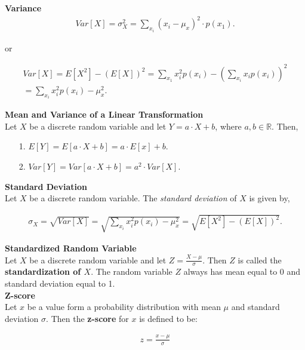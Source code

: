 \documentclass{article}
\numberwithin{theorem}{subsection}
\numberwithin{theorem}{subsubsection}
\theoremstyle{definition}
\numberwithin{definition}{subsection}
\numberwithin{definition}{subsubsection}
\begin{document}
\noindent \textbf{Variance} \\
\begin{gather*}
    Var[X] = \sigma_{X}^{2} = \sum_{x_{i}} (x_{i} - \mu_{x})^{2} \cdot p(x_{1}).    
\end{gather*}

or

\begin{gather*}
    Var[X] = E[X^2] - (E[X])^{2} = \sum_{x_{1}} x_{i}^{2} p(x_{i}) - \left ( \sum_{x_{i}} x_{i} p(x_{i})\right )^{2} \\
    = \sum_{x_{i}} x_{i}^{2} p(x_{i}) - \mu_{x}^{2}.
\end{gather*}

\noindent \textbf{Mean and Variance of a Linear Transformation} \\
\indent Let $X$ be a discrete random variable and let $Y = a\cdot X + b$, where $a,b \in \mathbb{R}$. Then,
\begin{itemize}
    \item[1.] \quad $E[Y] = E[a\cdot X + b] = a\cdot E[x] + b$.
    \item[2.] \quad $Var[Y] = Var[a\cdot X + b] = a^2 \cdot Var[X]$. 
\end{itemize}

\noindent \textbf{Standard Deviation} \\
Let $X$ be a discrete random variable. The \textit{standard deviation} of $X$ is given by,

\begin{gather*}
    \sigma_{X} = \sqrt{Var[X]} = \sqrt{\sum_{x_{i}} x_{i}^{2} p(x_{i}) - \mu_{x}^{2}} = \sqrt{E[X^2] - (E[X])^2}.
\end{gather*}

\noindent \textbf{Standardized Random Variable} \\
\indent Let $X$ be a discrete random variable and let $Z = \frac{X - \mu}{\sigma}$. Then $Z$ is called the \textbf{standardization of $X$}. The random variable $Z$ always has mean equal to 0 and standard deviation equal to 1.
\\

\noindent \textbf{Z-score} \\
\indent Let $x$ be a value form a probability distribution with mean $\mu$ and standard deviation $\sigma$. Then the \textbf{z-score} for $x$ is defined to be:

\begin{gather*}
    z = \frac{x - \mu}{\sigma}
\end{gather*}
\end{document}
